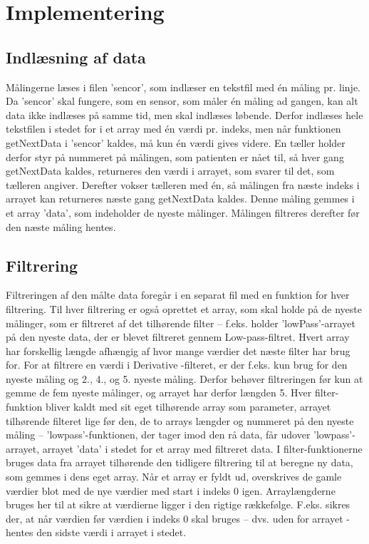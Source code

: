 \documentclass{article}
\begin{document}
\section{Implementering}

\subsection{Indlæsning af data}
Målingerne læses i filen ’sencor’, som indlæser en tekstfil med én måling pr. linje. Da ’sencor’ skal fungere, som en sensor, som måler én måling ad gangen, kan alt data ikke indlæses på samme tid, men skal indlæses løbende. Derfor indlæses hele tekstfilen i stedet for i et array med én værdi pr. indeks, men når funktionen getNextData i ’sencor’  kaldes, må kun én værdi gives videre. En tæller holder derfor styr på nummeret på målingen, som patienten er nået til, så hver gang getNextData kaldes, returneres den værdi i arrayet, som svarer til det, som tælleren angiver. Derefter vokser tælleren med én, så målingen fra næste indeks i arrayet kan returneres næste gang getNextData kaldes. Denne måling gemmes i et array ’data’, som indeholder de nyeste målinger. Målingen filtreres derefter før den næste måling hentes.

\subsection{Filtrering}
Filtreringen af den målte data foregår i en separat fil med en funktion for hver filtrering. Til hver filtrering er også oprettet et array, som skal holde på de nyeste målinger, som er filtreret af det tilhørende filter – f.eks. holder ’lowPass’-arrayet på den nyeste data, der er blevet filtreret gennem Low-pass-filtret. Hvert array har forskellig længde afhængig af hvor mange værdier det næste filter har brug for. For at filtrere en værdi i Derivative -filteret, er der f.eks. kun brug for den nyeste måling og 2., 4., og 5. nyeste måling. Derfor behøver filtreringen før kun at gemme de fem nyeste målinger, og arrayet har derfor længden 5.
Hver filter-funktion bliver kaldt med sit eget tilhørende array som parameter, arrayet tilhørende filteret lige før den, de to arrays længder og nummeret på den nyeste måling – ’lowpass’-funktionen, der tager imod den rå data, får udover ’lowpass’-arrayet, arrayet ’data’ i stedet for et array med filtreret data. I filter-funktionerne bruges data fra arrayet tilhørende den tidligere filtrering til at beregne ny data, som gemmes i dens eget array. Når et array er fyldt ud, overskrives de gamle værdier blot med de nye værdier med start i indeks 0 igen. Arraylængderne bruges her til at sikre at værdierne ligger i den rigtige rækkefølge. F.eks. sikres der, at når værdien før værdien i indeks 0 skal bruges – dvs. uden for arrayet -  hentes den sidste værdi i arrayet i stedet.
\end{document}
